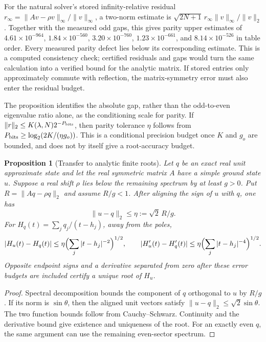 \documentclass[11pt,a4paper]{article}
\newtheorem{proposition}{Proposition}
\begin{document}
For the natural solver's stored infinity-relative residual
$r_\infty=\|Av-\rho v\|_\infty/\|v\|_\infty$, a two-norm estimate is
$\sqrt{2N+1}\,r_\infty\|v\|_\infty/\|v\|_2$.
Together with the measured odd gaps, this gives parity upper estimates
of $4.61\times10^{-964}$, $1.84\times10^{-560}$,
$3.20\times10^{-760}$, $1.23\times10^{-661}$, and
$8.14\times10^{-526}$ in table order. Every measured parity defect
lies below its corresponding estimate. This is a computed consistency
check; certified residuals and gaps would turn the same calculation
into a verified bound for the analytic matrix.
If stored entries only approximately commute with reflection, the
matrix-symmetry error must also enter the residual budget.

The proposition identifies the absolute gap, rather than the
odd-to-even eigenvalue ratio alone, as the conditioning scale for
parity. If $\|r\|_2\leq K(\lambda,N)2^{-P_{\rm bits}}$, then parity
tolerance $\eta$ follows from
$P_{\rm bits}\geq\log_2(2K/(\eta g_o))$.
This is a conditional precision budget once $K$ and $g_o$ are bounded,
and does not by itself give a root-accuracy budget.

\begin{proposition}[Transfer to analytic finite roots]
\label{prop:analytic_roots}
Let $q$ be an exact real unit approximate state and let the real
symmetric matrix $A$ have a simple ground state $u$. Suppose a real shift $\rho$ lies
below the remaining spectrum by at least $g>0$. Put
$R=\|Aq-\rho q\|_2$ and assume $R/g<1$. After aligning the sign of
$u$ with $q$, one has
\[
\|u-q\|_2\leq\eta:=\sqrt{2}\,R/g.
\]
For $H_q(t)=\sum_jq_j/(t-h_j)$, away from the poles,
\[
|H_u(t)-H_q(t)|\leq\eta\Bigl(\sum_j|t-h_j|^{-2}\Bigr)^{1/2},
\qquad
|H'_u(t)-H'_q(t)|\leq\eta\Bigl(\sum_j|t-h_j|^{-4}\Bigr)^{1/2}.
\]
Opposite endpoint signs and a derivative separated from zero after
these error budgets are included certify a unique root of $H_u$.
\end{proposition}
\begin{proof}
Spectral decomposition bounds the component of $q$ orthogonal to
$u$ by $R/g$. If its norm is $\sin\theta$, then the aligned unit
vectors satisfy $\|u-q\|_2\leq\sqrt{2}\sin\theta$.
The two function bounds follow from Cauchy--Schwarz. Continuity
and the derivative bound give existence and uniqueness of the root.
For an exactly even $q$, the same argument can use the remaining
even-sector spectrum.
\end{proof}
\end{document}
